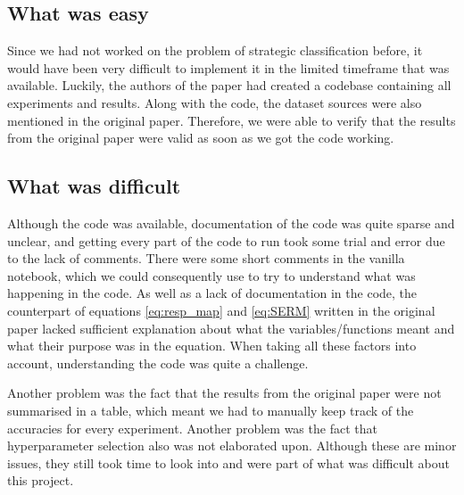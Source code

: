 \subsection{What was easy}
Since we had not worked on the problem of strategic classification before, it would have been very difficult to implement it in the limited timeframe that was available. Luckily, the authors of the paper had created a codebase containing all experiments and results. Along with the code, the dataset sources were also mentioned in the original paper. Therefore, we were able to verify that the results from the original paper were valid as soon as we got the code working. 


\subsection{What was difficult}
Although the code was available, documentation of the code was quite sparse and unclear, and getting every part of the code to run took some trial and error due to the lack of comments. There were some short comments in the vanilla notebook, which we could consequently use to try to understand what was happening in the code. As well as a lack of documentation in the code, the counterpart of equations \ref{eq:resp_map} and \ref{eq:SERM} written in the original paper lacked sufficient explanation about what the variables/functions meant and what their purpose was in the equation. When taking all these factors into account, understanding the code was quite a challenge. 

Another problem was the fact that the results from the original paper were not summarised in a table, which meant we had to manually keep track of the accuracies for every experiment. Another problem was the fact that hyperparameter selection also was not elaborated upon. Although these are minor issues, they still took time to look into and were part of what was difficult about this project.

